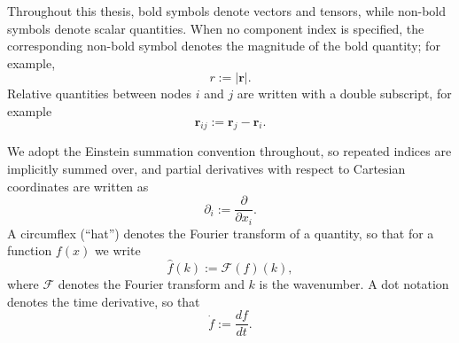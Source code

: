 Throughout this thesis, bold symbols denote vectors and tensors, while non-bold symbols denote scalar quantities. When no component index is specified, the corresponding non-bold symbol denotes the magnitude of the bold quantity; for example,
\[
    r := |\mathbf{r}|.
\]
Relative quantities between nodes $i$ and $j$ are written with a double subscript, for example
\[
    \mathbf{r}_{ij} := \mathbf{r}_j - \mathbf{r}_i.
\]

We adopt the Einstein summation convention throughout, so repeated indices are implicitly summed over, and partial derivatives with respect to Cartesian coordinates are written as
\[
    \partial_i := \frac{\partial}{\partial x_i}.
\]
A circumflex (``hat'') denotes the Fourier transform of a quantity, so that for a function $f(x)$ we write
\[
    \hat{f}(k) := \mathcal{F}(f)(k),
\]
where $\mathcal{F}$ denotes the Fourier transform and $k$ is the wavenumber.
A dot notation denotes the time derivative, so that
\[
    \dot{f} := \frac{df}{dt}.
\]
